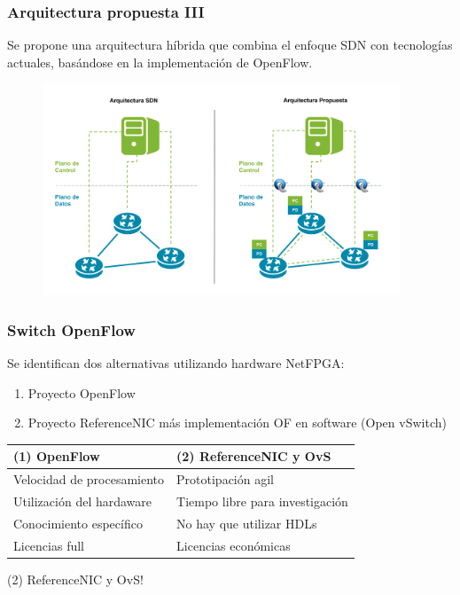 \documentclass{beamer}
\begin{document}
\begin{frame}
\frametitle{Arquitectura propuesta III} 

Se propone una arquitectura h\'ibrida que combina el enfoque SDN con tecnologías actuales, basándose 
en la implementaci\'on de OpenFlow.

\begin{figure}[H]
\centering
\includegraphics[width=0.95\textwidth, left]{imagenes/arquitecturapropuesta.png}
\end{figure}

\end{frame}


\begin{frame}
\frametitle{Switch OpenFlow} 

Se identifican dos alternativas utilizando hardware NetFPGA:
\pause 
\begin{enumerate}
\item Proyecto OpenFlow
\pause
\item Proyecto ReferenceNIC m\'as implementaci\'on OF en software (Open vSwitch)
\end{enumerate}

\pause
\begin{table}[]
\small
\centering
\label{label}
\begin{tabular}{| p{5cm} | p{5cm} |}

\hline
\multicolumn{1}{|l|}{(1) OpenFlow } & \multicolumn{1}{l|}{(2) ReferenceNIC y OvS } \\
\hline
Velocidad de procesamiento & Prototipaci\'on agil \\
Utilizaci\'on del hardaware &  Tiempo libre para investigaci\'on \\
Conocimiento espec\'ifico &  No hay que utilizar HDLs \\
Licencias full &  Licencias econ\'omicas \\

\hline  
\end{tabular}
\end{table}

\pause
{\color{blue} (2) ReferenceNIC y OvS!}

\end{frame}
\end{document}
